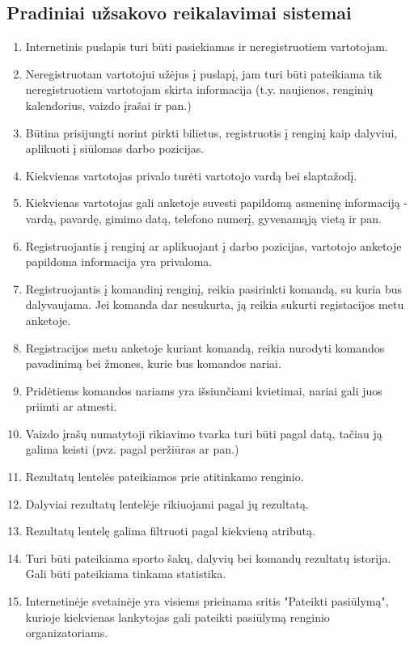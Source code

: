 \documentclass{VUMIFPSkursinis}
\begin{document}
        \subsection{Pradiniai užsakovo reikalavimai sistemai} \label{priedai_uzsakovoReikalavimai}
		\begin{enumerate}
			\item Internetinis puslapis turi būti pasiekiamas ir neregistruotiem vartotojam.
			\item Neregistruotam vartotojui užėjus į puslapį, jam turi būti pateikiama tik neregistruotiem vartotojam skirta informacija (t.y. naujienos, renginių kalendorius, vaizdo įrašai ir pan.)
			\item Būtina prisijungti norint pirkti bilietus, registruotis į renginį kaip dalyviui, aplikuoti į siūlomas darbo pozicijas.
			\item Kiekvienas vartotojas privalo turėti vartotojo vardą bei slaptažodį.
			\item Kiekvienas vartotojas gali anketoje suvesti papildomą asmeninę informaciją - vardą, pavardę, gimimo datą, telefono numerį, gyvenamąją vietą ir pan.
			\item Registruojantis į renginį ar aplikuojant į darbo pozicijas, vartotojo anketoje papildoma informacija yra privaloma.
			\item Registruojantis į komandinį renginį, reikia pasirinkti komandą, su kuria bus dalyvaujama. Jei komanda dar nesukurta, ją reikia sukurti registacijos metu anketoje.
			\item Registracijos metu anketoje kuriant komandą, reikia nurodyti komandos pavadinimą bei žmones, kurie bus komandos nariai.
			\item Pridėtiems komandos nariams yra išsiunčiami kvietimai, nariai gali juos priimti ar atmesti.
			\item Vaizdo įrašų numatytoji rikiavimo tvarka turi būti pagal datą, tačiau ją galima keisti (pvz. pagal peržiūras ar pan.)
			\item Rezultatų lentelės pateikiamos prie atitinkamo renginio.
			\item Dalyviai rezultatų lentelėje rikiuojami pagal jų rezultatą.
			\item Rezultatų lentelę galima filtruoti pagal kiekvieną atributą.
			\item Turi būti pateikiama sporto šakų, dalyvių bei komandų rezultatų istorija. Gali būti pateikiama tinkama statistika.
			\item Internetinėje svetainėje yra visiems prieinama sritis "Pateikti pasiūlymą", kurioje kiekvienas lankytojas gali pateikti pasiūlymą renginio organizatoriams.

\end{enumerate}
\end{document}
